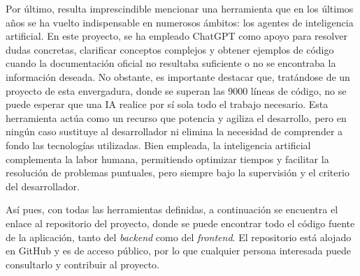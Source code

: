Por último, resulta imprescindible mencionar una herramienta que en los últimos años se ha vuelto indispensable en numerosos ámbitos: los agentes de inteligencia artificial. En este proyecto, se ha empleado ChatGPT como apoyo para resolver dudas concretas, clarificar conceptos complejos y obtener ejemplos de código cuando la documentación oficial no resultaba suficiente o no se encontraba la información deseada. No obstante, es importante destacar que, tratándose de un proyecto de esta envergadura, donde se superan las 9000 líneas de código, no se puede esperar que una IA realice por sí sola todo el trabajo necesario. Esta herramienta actúa como un recurso que potencia y agiliza el desarrollo, pero en ningún caso sustituye al desarrollador ni elimina la necesidad de comprender a fondo las tecnologías utilizadas. Bien empleada, la inteligencia artificial complementa la labor humana, permitiendo optimizar tiempos y facilitar la resolución de problemas puntuales, pero siempre bajo la supervisión y el criterio del desarrollador.

Así pues, con todas las herramientas definidas, a continuación se encuentra el enlace al repositorio del proyecto, donde se puede encontrar todo el código fuente de la aplicación, tanto del \textit{backend} como del \textit{frontend}. El repositorio está alojado en GitHub y es de acceso público, por lo que cualquier persona interesada puede consultarlo y contribuir al proyecto.

\begin{center}
    \hspace{1cm}
\end{center}
